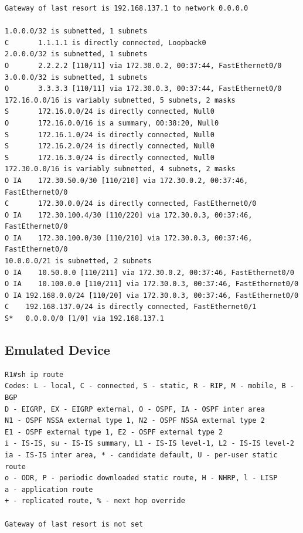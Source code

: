 \documentclass[11pt]{report}
\begin{document}
\begin{appendices}
\begin{lstlisting}
Gateway of last resort is 192.168.137.1 to network 0.0.0.0

1.0.0.0/32 is subnetted, 1 subnets
C       1.1.1.1 is directly connected, Loopback0
2.0.0.0/32 is subnetted, 1 subnets
O       2.2.2.2 [110/11] via 172.30.0.2, 00:37:44, FastEthernet0/0
3.0.0.0/32 is subnetted, 1 subnets
O       3.3.3.3 [110/11] via 172.30.0.3, 00:37:44, FastEthernet0/0
172.16.0.0/16 is variably subnetted, 5 subnets, 2 masks
S       172.16.0.0/24 is directly connected, Null0
O       172.16.0.0/16 is a summary, 00:38:20, Null0
S       172.16.1.0/24 is directly connected, Null0
S       172.16.2.0/24 is directly connected, Null0
S       172.16.3.0/24 is directly connected, Null0
172.30.0.0/16 is variably subnetted, 4 subnets, 2 masks
O IA    172.30.50.0/30 [110/210] via 172.30.0.2, 00:37:46, FastEthernet0/0
C       172.30.0.0/24 is directly connected, FastEthernet0/0
O IA    172.30.100.4/30 [110/220] via 172.30.0.3, 00:37:46, FastEthernet0/0
O IA    172.30.100.0/30 [110/210] via 172.30.0.3, 00:37:46, FastEthernet0/0
10.0.0.0/21 is subnetted, 2 subnets
O IA    10.50.0.0 [110/211] via 172.30.0.2, 00:37:46, FastEthernet0/0
O IA    10.100.0.0 [110/211] via 172.30.0.3, 00:37:46, FastEthernet0/0
O IA 192.168.0.0/24 [110/20] via 172.30.0.3, 00:37:46, FastEthernet0/0
C    192.168.137.0/24 is directly connected, FastEthernet0/1
S*   0.0.0.0/0 [1/0] via 192.168.137.1
\end{lstlisting}

\subsection{Emulated Device}
\begin{lstlisting}
R1#sh ip route
Codes: L - local, C - connected, S - static, R - RIP, M - mobile, B - BGP
D - EIGRP, EX - EIGRP external, O - OSPF, IA - OSPF inter area
N1 - OSPF NSSA external type 1, N2 - OSPF NSSA external type 2
E1 - OSPF external type 1, E2 - OSPF external type 2
i - IS-IS, su - IS-IS summary, L1 - IS-IS level-1, L2 - IS-IS level-2
ia - IS-IS inter area, * - candidate default, U - per-user static route
o - ODR, P - periodic downloaded static route, H - NHRP, l - LISP
a - application route
+ - replicated route, % - next hop override

Gateway of last resort is not set


\end{lstlisting}
\end{appendices}
\end{document}
